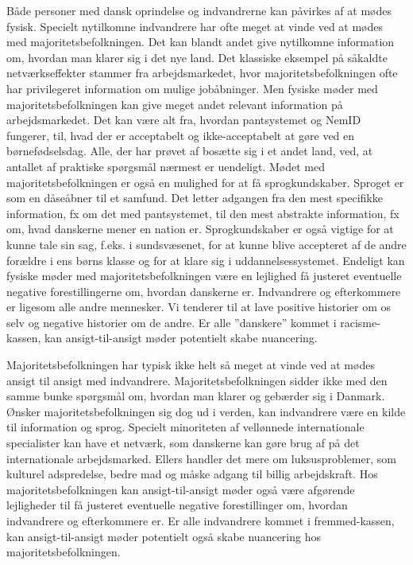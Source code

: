 \documentclass[
]{book}
\begin{document}
Både personer med dansk oprindelse og indvandrerne kan påvirkes af at mødes fysisk. Specielt nytilkomne indvandrere har ofte meget at vinde ved at mødes med majoritetsbefolkningen. Det kan blandt andet give nytilkomne information om, hvordan man klarer sig i det nye land. Det klassiske eksempel på såkaldte netværkseffekter stammer fra arbejdsmarkedet, hvor majoritetsbefolkningen ofte har privilegeret information om mulige jobåbninger. Men fysiske møder med majoritetsbefolkningen kan give meget andet relevant information på arbejdsmarkedet. Det kan være alt fra, hvordan pantsystemet og NemID fungerer, til, hvad der er acceptabelt og ikke-acceptabelt at gøre ved en børnefødselsdag. Alle, der har prøvet af bosætte sig i et andet land, ved, at antallet af praktiske spørgsmål nærmest er uendeligt. Mødet med majoritetsbefolkningen er også en mulighed for at få sprogkundskaber. Sproget er som en dåseåbner til et samfund. Det letter adgangen fra den mest specifikke information, fx om det med pantsystemet, til den mest abstrakte information, fx om, hvad danskerne mener en nation er. Sprogkundskaber er også vigtige for at kunne tale sin sag, f.eks. i sundsvæsenet, for at kunne blive accepteret af de andre forældre i ens børns klasse og for at klare sig i uddannelsessystemet. Endeligt kan fysiske møder med majoritetsbefolkningen være en lejlighed få justeret eventuelle negative forestillingerne om, hvordan danskerne er. Indvandrere og efterkommere er ligesom alle andre mennesker. Vi tenderer til at lave positive historier om os selv og negative historier om de andre. Er alle ''danskere'' kommet i racisme-kassen, kan ansigt-til-ansigt møder potentielt skabe nuancering.

Majoritetsbefolkningen har typisk ikke helt så meget at vinde ved at mødes ansigt til ansigt med indvandrere. Majoritetsbefolkningen sidder ikke med den samme bunke spørgsmål om, hvordan man klarer og gebærder sig i Danmark. Ønsker majoritetsbefolkningen sig dog ud i verden, kan indvandrere være en kilde til information og sprog. Specielt minoriteten af vellønnede internationale specialister kan have et netværk, som danskerne kan gøre brug af på det internationale arbejdsmarked. Ellers handler det mere om luksusproblemer, som kulturel adspredelse, bedre mad og måske adgang til billig arbejdskraft. Hos majoritetsbefolkningen kan ansigt-til-ansigt møder også være afgørende lejligheder til få justeret eventuelle negative forestillinger om, hvordan indvandrere og efterkommere er. Er alle indvandrere kommet i fremmed-kassen, kan ansigt-til-ansigt møder potentielt også skabe nuancering hos majoritetsbefolkningen.
\end{document}
